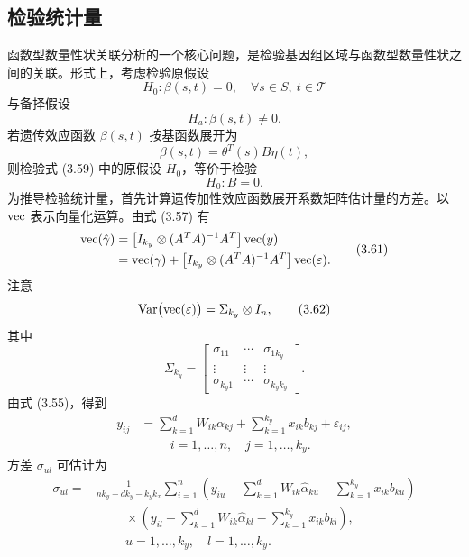 \subsection{检验统计量}

函数型数量性状关联分析的一个核心问题，是检验基因组区域与函数型数量性状之间的关联。形式上，考虑检验原假设
\begin{equation}
H_0:\beta(s,t)=0,\quad \forall s\in S,\ t\in\mathcal T
\tag{3.59}
\end{equation}
与备择假设
\[
H_a:\beta(s,t)\ne0.
\]
若遗传效应函数 $\beta(s,t)$ 按基函数展开为
\[
\beta(s,t)=\theta^T(s)B\eta(t),
\]
则检验式 (3.59) 中的原假设 $H_0$，等价于检验
\begin{equation}
H_0:B=0.
\tag{3.60}
\end{equation}
为推导检验统计量，首先计算遗传加性效应函数展开系数矩阵估计量的方差。以 $\operatorname{vec}$ 表示向量化运算。由式 (3.57) 有
\begin{equation}
\begin{aligned}
\operatorname{vec}(\hat\gamma)
&=\bigl[I_{k_y}\otimes(A^TA)^{-1}A^T\bigr]\operatorname{vec}(y)\\
&=\operatorname{vec}(\gamma)+\bigl[I_{k_y}\otimes(A^TA)^{-1}A^T\bigr]\operatorname{vec}(\varepsilon).
\end{aligned}
\tag{3.61}
\end{equation}
注意
\begin{equation}
\operatorname{Var}\bigl(\operatorname{vec}(\varepsilon)\bigr)=\Sigma_{k_y}\otimes I_n,
\tag{3.62}
\end{equation}
其中
\begin{equation}
\Sigma_{k_y}=\begin{bmatrix}
\sigma_{11}&\cdots&\sigma_{1k_y}\\
\vdots&\vdots&\vdots\\
\sigma_{k_y1}&\cdots&\sigma_{k_yk_y}
\end{bmatrix}.
\tag{3.63}
\end{equation}
由式 (3.55)，得到
\begin{equation}
\begin{aligned}
y_{ij}&=\sum_{k=1}^{d}W_{ik}\alpha_{kj}+\sum_{k=1}^{k_y}x_{ik}b_{kj}+\varepsilon_{ij},\\
&\hspace{1cm}i=1,\ldots,n,\quad j=1,\ldots,k_y.
\end{aligned}
\tag{3.64}
\end{equation}
方差 $\sigma_{ul}$ 可估计为
\[
\begin{aligned}
\sigma_{ul}={}&\frac{1}{nk_y-dk_y-k_yk_x}\sum_{i=1}^{n}
\left(y_{iu}-\sum_{k=1}^{d}W_{ik}\hat\alpha_{ku}-\sum_{k=1}^{k_y}x_{ik}b_{ku}\right)\\
&\hspace{1cm}\times
\left(y_{il}-\sum_{k=1}^{d}W_{ik}\hat\alpha_{kl}-\sum_{k=1}^{k_y}x_{ik}b_{kl}\right),\\
&\hspace{1cm}u=1,\ldots,k_y,\quad l=1,\ldots,k_y.
\end{aligned}
\]

